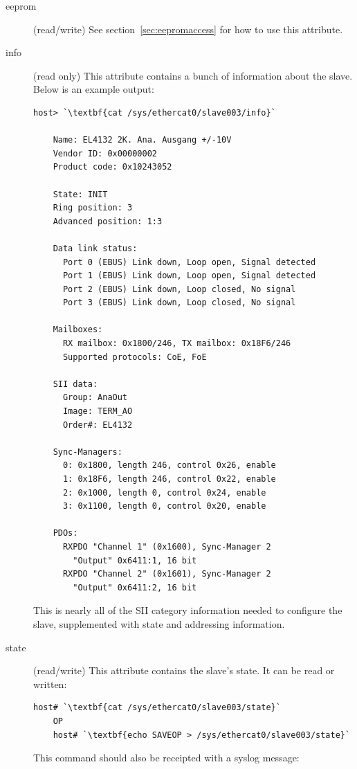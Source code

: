 \documentclass[a4paper,12pt,BCOR6mm,bibtotoc,idxtotoc]{scrbook}
\begin{document}
\begin{description}
\item[eeprom] (read/write) See section~\ref{sec:eepromaccess} for how
  to use this attribute.

\item[info] (read only) This attribute contains a bunch of information
  about the slave. Below is an example output:

  \begin{lstlisting}[gobble=4]
    host> `\textbf{cat /sys/ethercat0/slave003/info}`

    Name: EL4132 2K. Ana. Ausgang +/-10V
    Vendor ID: 0x00000002
    Product code: 0x10243052

    State: INIT
    Ring position: 3
    Advanced position: 1:3

    Data link status:
      Port 0 (EBUS) Link down, Loop open, Signal detected
      Port 1 (EBUS) Link down, Loop open, Signal detected
      Port 2 (EBUS) Link down, Loop closed, No signal
      Port 3 (EBUS) Link down, Loop closed, No signal

    Mailboxes:
      RX mailbox: 0x1800/246, TX mailbox: 0x18F6/246
      Supported protocols: CoE, FoE

    SII data:
      Group: AnaOut
      Image: TERM_AO
      Order#: EL4132

    Sync-Managers:
      0: 0x1800, length 246, control 0x26, enable
      1: 0x18F6, length 246, control 0x22, enable
      2: 0x1000, length 0, control 0x24, enable
      3: 0x1100, length 0, control 0x20, enable

    PDOs:
      RXPDO "Channel 1" (0x1600), Sync-Manager 2
        "Output" 0x6411:1, 16 bit
      RXPDO "Channel 2" (0x1601), Sync-Manager 2
        "Output" 0x6411:2, 16 bit
  \end{lstlisting}

  This is nearly all of the SII category information needed to
  configure the slave, supplemented with state and addressing
  information.

\item[state] (read/write) This attribute contains the slave's state.
  It can be read or written:

  \begin{lstlisting}[gobble=4]
    host# `\textbf{cat /sys/ethercat0/slave003/state}`
    OP
    host# `\textbf{echo SAVEOP > /sys/ethercat0/slave003/state}`
  \end{lstlisting}

  This command should also be receipted with a syslog message:


\end{description}
\end{document}
